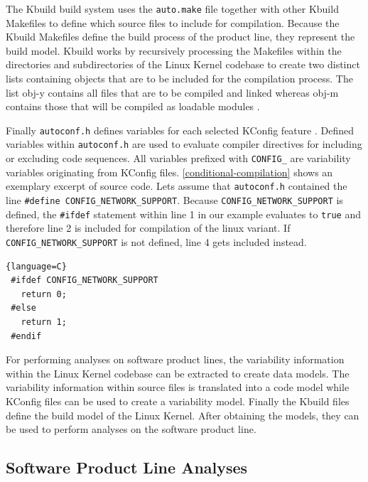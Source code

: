 \documentclass[a4paper]{article}
\begin{document}
The Kbuild build system uses the \texttt{auto.make} file together with other Kbuild Makefiles to define which source files to include for compilation. Because the Kbuild Makefiles define the build process of the product line, they represent the build model. Kbuild works by recursively processing the Makefiles within the directories and subdirectories of the Linux Kernel codebase to create two distinct lists containing objects that are to be included for the compilation process. The list obj-y contains all files that are to be compiled and linked whereas  obj-m contains those that will be compiled as loadable modules \cite{nadi-linux-kernel}\cite{makefiles.txt}. 

Finally \texttt{autoconf.h} defines variables for each selected KConfig feature \cite{Tartler:2011:FCC:1966445.1966451}. Defined variables within \texttt{autoconf.h} are used to evaluate compiler directives for including or excluding code sequences. All variables prefixed with \texttt{CONFIG\_} are variability variables originating from KConfig files. \autoref{conditional-compilation} shows an exemplary excerpt of source code. Lets assume that \texttt{autoconf.h} contained the line \texttt{\#define CONFIG\_\-NETWORK\_\-SUPPORT}. Because \texttt{CONFIG\_\-NETWORK\_\-SUPPORT} is defined, the \texttt{\#ifdef} statement within line 1 in our example evaluates to \texttt{true} and therefore line 2 is included for compilation of the  linux variant. If \texttt{CONFIG\_\-NETWORK\_\-SUPPORT} is not defined, line 4 gets included instead.

\begin{lstlisting}[caption=Conditional Compilation within the Linux Kernel, label=conditional-compilation]{language=C}
 #ifdef CONFIG_NETWORK_SUPPORT
   return 0;
 #else 
   return 1;
 #endif
\end{lstlisting}

For performing analyses on software product lines, the variability information within the Linux Kernel codebase can be extracted to create data models. The variability information within source files is translated into a code model while KConfig files can be used to create a variability model. Finally the Kbuild files define the build model of the Linux Kernel. After obtaining the models, they can be used to perform analyses on the software product line.

\subsection{Software Product Line Analyses} \label{software-analyses}
\end{document}
